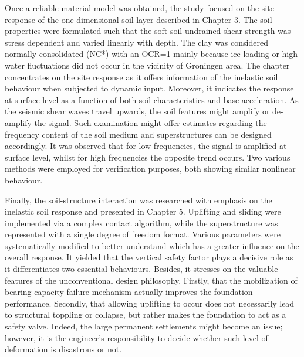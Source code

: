 Once a reliable material model was obtained, the study focused on the site response of the one-dimensional soil layer described in Chapter 3. The soil properties were formulated such that the soft soil undrained shear strength was stress dependent and varied linearly with depth. The clay was considered normally consolidated (NC*) with an OCR=1 mainly because ice loading or high water fluctuations did not occur in the vicinity of Groningen area. The chapter concentrates on the site response as it offers information of the inelastic soil behaviour when subjected to dynamic input. Moreover, it indicates the response at surface level as a function of both soil characteristics and base acceleration. As the seismic shear waves travel upwards, the soil features might amplify or de-amplify the signal. Such examination might offer estimates regarding the frequency content of the soil medium and superstructures can be designed accordingly. It was observed that for low frequencies, the signal is amplified at surface level, whilst for high frequencies the opposite trend occurs. Two various methods were employed for verification purposes, both showing similar nonlinear behaviour.

 Finally, the soil-structure interaction was researched with emphasis on the inelastic soil response and presented in Chapter 5. Uplifting and sliding were implemented via a complex contact algorithm, while the superstructure was represented with a single degree of freedom format. Various parameters were systematically modified to better understand which has a greater influence on the overall response. It yielded that the vertical safety factor plays a decisive role as it differentiates two essential behaviours. Besides, it stresses on the valuable features of the unconventional design philosophy. Firstly, that the mobilization of bearing capacity failure mechanism actually improves the foundation performance. Secondly, that allowing uplifting to occur does not necessarily lead to structural toppling or collapse, but rather makes the foundation to act as a safety valve. Indeed, the large permanent settlements might become an issue; however, it is the engineer's responsibility to decide whether such level of deformation is disastrous or not. 
 
